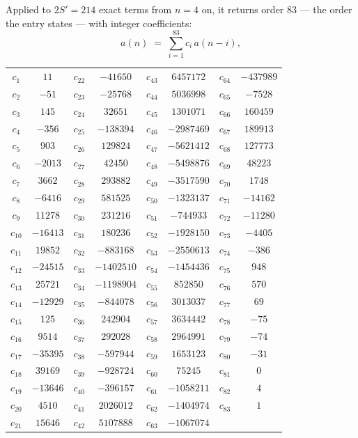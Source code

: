 \documentclass[11pt,a4paper]{article}
\theoremstyle{plain}
\theoremstyle{definition}
\begin{document}
Applied to $2S'=214$ exact terms from $n=4$ on, it returns order $83$ --- the
order the entry states --- with integer coefficients:
\[
a(n)\;=\;\sum_{i=1}^{83}c_i\,a(n-i),
\]
\begin{center}\small
\begin{tabular}{cccccccc}
$c_{1}$ & $11$ & $c_{22}$ & $-41650$ & $c_{43}$ & $6457172$ & $c_{64}$ & $-437989$ \\
$c_{2}$ & $-51$ & $c_{23}$ & $-25768$ & $c_{44}$ & $5036998$ & $c_{65}$ & $-7528$ \\
$c_{3}$ & $145$ & $c_{24}$ & $32651$ & $c_{45}$ & $1301071$ & $c_{66}$ & $160459$ \\
$c_{4}$ & $-356$ & $c_{25}$ & $-138394$ & $c_{46}$ & $-2987469$ & $c_{67}$ & $189913$ \\
$c_{5}$ & $903$ & $c_{26}$ & $129824$ & $c_{47}$ & $-5621412$ & $c_{68}$ & $127773$ \\
$c_{6}$ & $-2013$ & $c_{27}$ & $42450$ & $c_{48}$ & $-5498876$ & $c_{69}$ & $48223$ \\
$c_{7}$ & $3662$ & $c_{28}$ & $293882$ & $c_{49}$ & $-3517590$ & $c_{70}$ & $1748$ \\
$c_{8}$ & $-6416$ & $c_{29}$ & $581525$ & $c_{50}$ & $-1323137$ & $c_{71}$ & $-14162$ \\
$c_{9}$ & $11278$ & $c_{30}$ & $231216$ & $c_{51}$ & $-744933$ & $c_{72}$ & $-11280$ \\
$c_{10}$ & $-16413$ & $c_{31}$ & $180236$ & $c_{52}$ & $-1928150$ & $c_{73}$ & $-4405$ \\
$c_{11}$ & $19852$ & $c_{32}$ & $-883168$ & $c_{53}$ & $-2550613$ & $c_{74}$ & $-386$ \\
$c_{12}$ & $-24515$ & $c_{33}$ & $-1402510$ & $c_{54}$ & $-1454436$ & $c_{75}$ & $948$ \\
$c_{13}$ & $25721$ & $c_{34}$ & $-1198904$ & $c_{55}$ & $852850$ & $c_{76}$ & $570$ \\
$c_{14}$ & $-12929$ & $c_{35}$ & $-844078$ & $c_{56}$ & $3013037$ & $c_{77}$ & $69$ \\
$c_{15}$ & $125$ & $c_{36}$ & $242904$ & $c_{57}$ & $3634442$ & $c_{78}$ & $-75$ \\
$c_{16}$ & $9514$ & $c_{37}$ & $292028$ & $c_{58}$ & $2964991$ & $c_{79}$ & $-74$ \\
$c_{17}$ & $-35395$ & $c_{38}$ & $-597944$ & $c_{59}$ & $1653123$ & $c_{80}$ & $-31$ \\
$c_{18}$ & $39169$ & $c_{39}$ & $-928724$ & $c_{60}$ & $75245$ & $c_{81}$ & $0$ \\
$c_{19}$ & $-13646$ & $c_{40}$ & $-396157$ & $c_{61}$ & $-1058211$ & $c_{82}$ & $4$ \\
$c_{20}$ & $4510$ & $c_{41}$ & $2026012$ & $c_{62}$ & $-1404974$ & $c_{83}$ & $1$ \\
$c_{21}$ & $15646$ & $c_{42}$ & $5107888$ & $c_{63}$ & $-1067074$ &  &  \\
\end{tabular}
\end{center}
\end{document}
